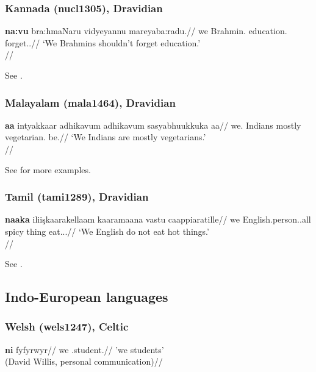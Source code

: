 \subsubsection{Kannada (nucl1305), Dravidian}

\ex \begingl
\gla \textbf{na:vu} bra:hmaNaru vidyeyannu mareyaba:radu.//
\glb we Brahmin.\Pl{} education.\Acc{} forget.\Inf.\Proh//
\glft `We Brahmins shouldn't forget education.'\\\citep[209, (755)]{sridhar1990}//
\endgl
\xe

See \citet[205, 208f.]{sridhar1990}.

\subsubsection{Malayalam (mala1464), Dravidian}

\ex \begingl
\gla \textbf{\textltailn{}a\ng\ng{}a\textrtaill{}} intyakkaar adhikavum adhikavum sasyabhuukkuka\textrtaill{} aa\textrtailn{}\textschwa{}//
\glb we.\Excl{} Indians mostly vegetarian.\Pl{} be.\Prs{}//
\glft `We Indians are mostly vegetarians.'\\\citep[262, (1340)]{asherkumari1997}//
\endgl
\xe 

See  \citealp[262f.]{asherkumari1997} for more examples.

\subsubsection{Tamil (tami1289), Dravidian}

\ex \begingl
\gla \textbf{naa\ng{}ka} i\ng{}lii\c{s}kaara\ng{}kellaam kaaramaana vastu caappi\textrtailt{}aratille//
\glb we English.person.\Pl.all spicy thing eat.\Prs.\Nom{}.\Neg//
\glft `We English do not eat hot things.'\\\citep[146]{asher1985}//
\endgl
\xe 

See \citet[142, 146]{asher1985}.

\subsection{Indo-European languages}


\subsubsection{Welsh (wels1247), Celtic}

\ex \begingl
\gla \textbf{ni} fyfyrwyr//
\glb we \Softmut.student.\Pl{}//
\glft 'we students'\\(David Willis, personal communication)//
\endgl
\xe

